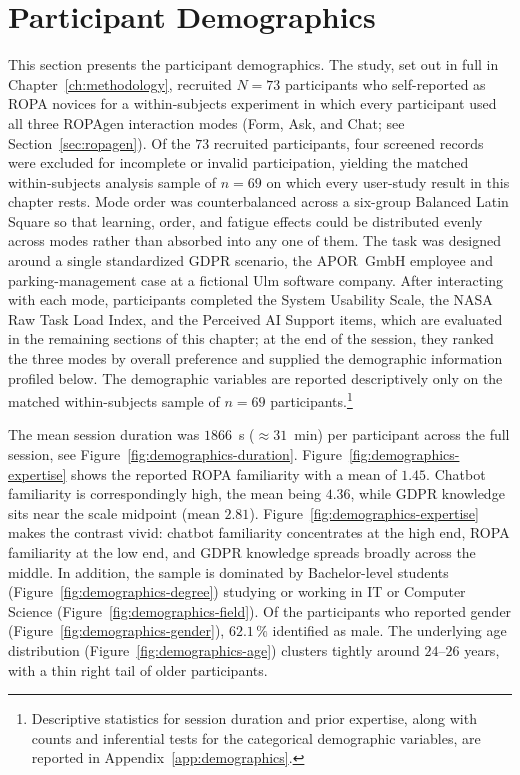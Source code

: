 \section{Participant Demographics}
\label{sec:eval-demographics}

This section presents the participant demographics.
The study, set out in full in Chapter~\ref{ch:methodology}, recruited $N = 73$ participants who self-reported
as ROPA novices for a within-subjects experiment in which every
participant used all three ROPAgen interaction modes (Form, Ask, and
Chat; see Section~\ref{sec:ropagen}).
Of the $73$ recruited participants, four screened records were
excluded for incomplete or invalid participation, yielding the matched
within-subjects analysis sample of $n = 69$ on which every
user-study result in this chapter rests.
Mode order was counterbalanced
across a six-group Balanced Latin Square so that learning, order, and
fatigue effects could be distributed evenly across modes rather than
absorbed into any one of them. The task was designed around a single standardized GDPR scenario, the
APOR~GmbH employee and parking-management case at a fictional Ulm
software company. After interacting with each mode, participants completed the System
Usability Scale, the NASA Raw Task Load Index, and the Perceived AI
Support items, which are evaluated in the remaining sections of this chapter;
at the end of the session, they ranked the three modes
by overall preference and supplied the demographic information
profiled below. The demographic variables are reported descriptively only on the
matched within-subjects sample of $n = 69$ participants.\footnote{Descriptive
statistics for session duration and prior expertise, along with
counts and inferential tests for the categorical demographic
variables, are reported in Appendix~\ref{app:demographics}.}

The mean session duration was $1866$~s ($\approx 31$~min) per
participant across the full session, see Figure~\ref{fig:demographics-duration}.
Figure~\ref{fig:demographics-expertise} shows the reported ROPA familiarity with a mean of $1.45$.
Chatbot familiarity is correspondingly high, the mean being $4.36$,
while GDPR knowledge sits near the scale midpoint (mean $2.81$).
Figure~\ref{fig:demographics-expertise} makes the contrast vivid:
chatbot familiarity concentrates at the high end, ROPA familiarity
at the low end, and GDPR knowledge spreads broadly across the middle.
In addition, the sample is dominated by Bachelor-level students
(Figure~\ref{fig:demographics-degree}) studying or working in IT or
Computer Science (Figure~\ref{fig:demographics-field}).
Of the participants who reported gender (Figure~\ref{fig:demographics-gender}), $62.1\,\%$
identified as male.
The underlying age distribution (Figure~\ref{fig:demographics-age}) clusters tightly around
$24$--$26$ years, with a thin right tail of older participants.

